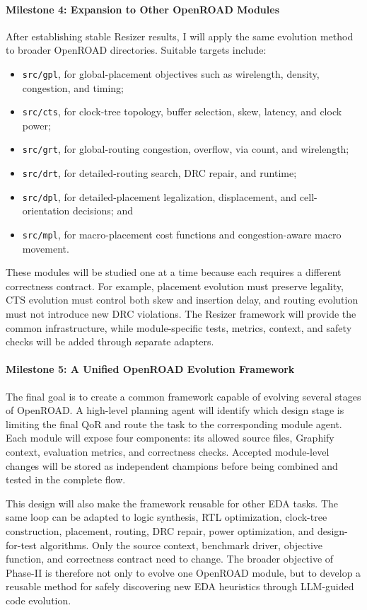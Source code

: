 \documentclass[10pt, conference]{IEEEtran}
\begin{document}
\paragraph{Milestone 4: Expansion to Other OpenROAD Modules}
After establishing stable Resizer results, I will apply the same evolution method to broader OpenROAD directories. Suitable targets include:
\begin{itemize}
  \item \texttt{src/gpl}, for global-placement objectives such as wirelength, density, congestion, and timing;
  \item \texttt{src/cts}, for clock-tree topology, buffer selection, skew, latency, and clock power;
  \item \texttt{src/grt}, for global-routing congestion, overflow, via count, and wirelength;
  \item \texttt{src/drt}, for detailed-routing search, DRC repair, and runtime;
  \item \texttt{src/dpl}, for detailed-placement legalization, displacement, and cell-orientation decisions; and
  \item \texttt{src/mpl}, for macro-placement cost functions and congestion-aware macro movement.
\end{itemize}

These modules will be studied one at a time because each requires a different correctness contract. For example, placement evolution must preserve legality, CTS evolution must control both skew and insertion delay, and routing evolution must not introduce new DRC violations. The Resizer framework will provide the common infrastructure, while module-specific tests, metrics, context, and safety checks will be added through separate adapters.

\paragraph{Milestone 5: A Unified OpenROAD Evolution Framework}
The final goal is to create a common framework capable of evolving several stages of OpenROAD. A high-level planning agent will identify which design stage is limiting the final QoR and route the task to the corresponding module agent. Each module will expose four components: its allowed source files, Graphify context, evaluation metrics, and correctness checks. Accepted module-level changes will be stored as independent champions before being combined and tested in the complete flow.

This design will also make the framework reusable for other EDA tasks. The same loop can be adapted to logic synthesis, RTL optimization, clock-tree construction, placement, routing, DRC repair, power optimization, and design-for-test algorithms. Only the source context, benchmark driver, objective function, and correctness contract need to change. The broader objective of Phase-II is therefore not only to evolve one OpenROAD module, but to develop a reusable method for safely discovering new EDA heuristics through LLM-guided code evolution.
\end{document}
